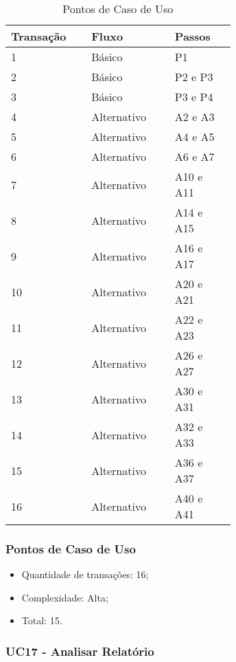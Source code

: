 \begin{table*}[!h]
\centering
\caption{Pontos de Caso de Uso}
\label{Rotulo}
  \begin{tabular}{|p{0.20\linewidth}|p{0.25\linewidth}|p{0.20\linewidth}|}
  \hline
  \textbf{Transação} & \textbf{Fluxo} & \textbf{Passos} \\ 
  \hline
  1 & Básico & P1\\
  \hline
  2 & Básico & P2 e P3\\
  \hline
  3 & Básico & P3 e P4\\
  \hline
  4 & Alternativo & A2 e A3\\
  \hline
  5 & Alternativo & A4 e A5\\
  \hline
  6 & Alternativo & A6 e A7\\
  \hline
  7 & Alternativo & A10 e A11\\
  \hline
  8 & Alternativo & A14 e A15\\
  \hline
  9 & Alternativo & A16 e A17\\
  \hline
  10 & Alternativo & A20 e A21\\
  \hline
  11 & Alternativo & A22 e A23\\
  \hline
  12 & Alternativo & A26 e A27\\
   \hline
  13 & Alternativo & A30 e A31\\
  \hline
  14 & Alternativo & A32 e A33\\
   \hline
  15 & Alternativo & A36 e A37\\
  \hline
  16 & Alternativo & A40 e A41\\
  \hline
  \end{tabular}
\end{table*}

\pagebreak
\subsubsection{Pontos de Caso de Uso}

\begin{itemize}
 \item Quantidade de transações: 16;
 \item Complexidade: Alta;
 \item Total: 15.
\end{itemize}

\vfill

\subsubsection{UC17 - Analisar Relatório}

